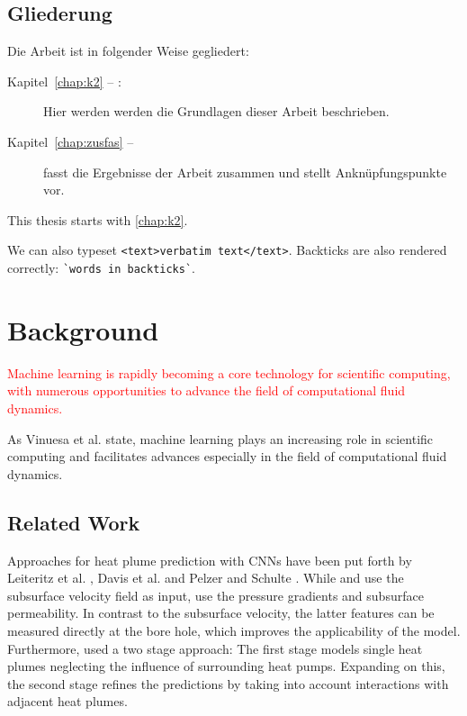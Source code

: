 \documentclass[
  a4paper,  %
  twoside,  %
  bibliography=totoc,
  headsepline,
  cleardoublepage=empty,
  parskip=half,
  draft=false
]{scrbook}
\begin{document}
\section*{Gliederung}
Die Arbeit ist in folgender Weise gegliedert:
\begin{description}
\item[Kapitel~\ref{chap:k2} -- :] Hier werden werden die Grundlagen dieser Arbeit beschrieben.
\item[Kapitel~\ref{chap:zusfas} -- ] fasst die Ergebnisse der Arbeit zusammen und stellt Anknüpfungspunkte vor.
\end{description}




This thesis starts with \cref{chap:k2}.

We can also typeset \verb|<text>verbatim text</text>|.
Backticks are also rendered correctly: \verb|`words in backticks`|.


\chapter{Background}
\textcolor{red}{Machine learning is rapidly becoming a core technology for scientiﬁc computing, with numerous opportunities to advance the ﬁeld of computational ﬂuid dynamics. } \cite{vin2021}

As Vinuesa et al. \cite{vin2021} state, machine learning plays an increasing role in scientific computing and facilitates advances especially in the field of computational fluid dynamics. 
\section{Related Work}
Approaches for heat plume prediction with CNNs have been put forth by Leiteritz et al. \cite{leiteritz2022deep}, Davis et al. \cite{davis2023deep} and Pelzer and Schulte \cite{pelzer2024}. 
While \cite{leiteritz2022deep} and \cite{davis2023deep} use the subsurface velocity field as input, \cite{pelzer2024} use the pressure gradients and subsurface permeability.
In contrast to the subsurface velocity, the latter features can be measured directly at the bore hole, which improves the applicability of the model. Furthermore, \cite{pelzer2024} used a two stage approach: The first stage models single heat plumes neglecting the influence of surrounding heat pumps. Expanding on this, the second stage refines the predictions by taking into account interactions with adjacent heat plumes.
\end{document}
